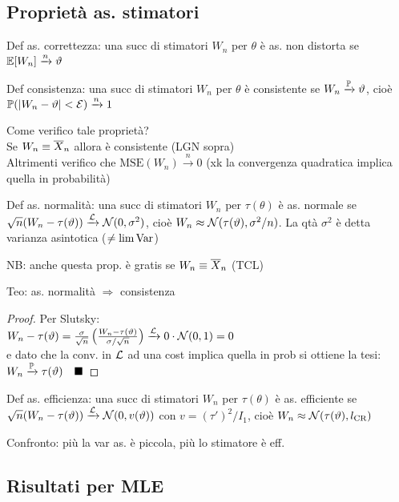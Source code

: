 \subsection{Proprietà as. stimatori}

Def as. correttezza: una succ di stimatori $W_n$ per $\theta$ è as. non distorta se $\mathbb{E}[W_n]\xrightarrow{n}\vartheta$

\smallskip

Def consistenza: una succ di stimatori $W_n$ per $\theta$ è consistente se $W_n\xrightarrow{\mathbb{P}}\vartheta$, cioè $\mathbb{P}(|W_n-\vartheta|<\mathcal{E})\xrightarrow{n}1$

\smallskip

Come verifico tale proprietà? \\
Se $W_n\equiv \overline{X}_n$ allora è consistente (LGN sopra) \\
Altrimenti verifico che $\text{MSE}(W_n)\xrightarrow{n} 0$ (xk la convergenza quadratica implica quella in probabilità)

\smallskip

Def as. normalità: una succ di stimatori $W_n$ per $\tau(\theta)$ è as. normale se $\sqrt{n}(W_n-\tau(\vartheta))\xrightarrow{\mathcal{L}}\mathcal{N}(0,\sigma^2)$, cioè $W_n\approx \mathcal{N}(\tau(\vartheta),\sigma^2/n)$. La qtà $\sigma^2$ è detta varianza asintotica ($\neq \lim\operatorname{Var}$)

\smallskip

NB: anche questa prop. è gratis se $W_n\equiv\overline{X}_n$ (TCL)

\smallskip

Teo: as. normalità $\Rightarrow$ consistenza

\begin{proof} Per Slutsky: \\
$W_n-\tau(\vartheta)=\frac{\sigma}{\sqrt{n}}\left(\frac{W_n-\tau(\vartheta)}{\sigma/\sqrt{n}}\right)\xrightarrow{\mathcal{L}}0\cdot\mathcal{N}(0,1)=0$ \\
e dato che la conv. in $\mathcal{L}$ ad una cost implica quella in prob si ottiene la tesi: $W_n\xrightarrow{\mathbb{P}}\tau(\vartheta)\quad\blacksquare$
\end{proof}

Def as. efficienza: una succ di stimatori $W_n$ per $\tau(\theta)$ è as. efficiente se $\sqrt{n}(W_n-\tau(\vartheta))\xrightarrow{\mathcal{L}}\mathcal{N}(0,v(\vartheta))$ con $v=\left(\tau'\right)^2/I_1$, cioè $W_n\approx \mathcal{N}(\tau(\vartheta),l_{\text{CR}})$

\smallskip

Confronto: più la var as. è piccola, più lo stimatore è eff.

\subsection{Risultati per MLE}

